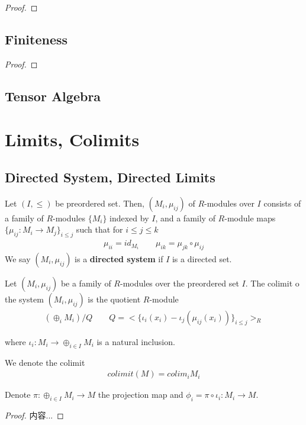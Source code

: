 \documentclass[Total.tex]{subfiles}
\begin{document}
			\begin{proof}
			\end{proof}
			
			\subsection{Finiteness}
			
			\begin{lemma}
			\end{lemma}
			
			\begin{proof}
			\end{proof}
			
			\subsection{Tensor Algebra}
		
		\section{Limits, Colimits}
			\subsection{Directed System, Directed Limits}
			\begin{Def}
				Let $(I,\leq)$ be preordered set. Then, $(M_i,\mu_{ij})$ of $R$-modules over $I$ consists of a family of $R$-modules $\{M_i\}$ indexed by $I$, and a family of $R$-module maps $\{\mu_{ij}:M_i\rightarrow M_j\}_{i\leq j}$ such that for $i\leq j\leq k$ 
				\begin{gather*}
					\mu_{ii}=id_{M_i}\qquad \mu_{ik}=\mu_{jk}\circ \mu_{ij}
				\end{gather*}
				We say $(M_i,\mu_{ij})$ is a \textbf{directed system} if $I$ is a directed set.
			\end{Def}
			
			\begin{lemma}
				Let $(M_i,\mu_{ij})$ be a family of $R$-modules over the preordered set $I$. The colimit o the system $(M_i,\mu_{ij})$ is the quotient $R$-module
				\begin{gather*}
					(\oplus_i M_i)/Q\qquad Q=<\{\iota_i(x_i)-\iota_j(\mu_{ij}(x_i))\}_{i\leq j}>_R
				\end{gather*}
				
				where $\iota_i:M_i\rightarrow \oplus_{i\in I} M_i$ is a natural inclusion.
				
				We denote the colimit
				\begin{gather*}
					colimit(M)=colim_i M_i
				\end{gather*}
				
				Denote $\pi:\oplus_{i\in I} M_i\rightarrow M$ the projection map and $\phi_i=\pi\circ \iota_i:M_i\rightarrow M$.
			\end{lemma}
			\begin{proof}
				内容...
			\end{proof}
			
\end{document}
